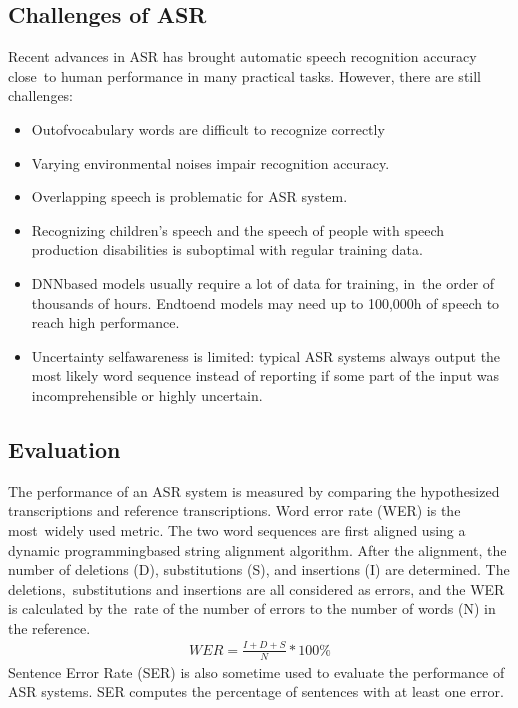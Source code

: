 \documentclass[letterpaper,10pt,english]{jupyterBook}
\begin{document}
\subsection{Challenges of ASR}
\label{\detokenize{Recognition/Speech_Recognition:challenges-of-asr}}
\sphinxAtStartPar
Recent advances in ASR has brought automatic speech recognition accuracy
close to human performance in many practical tasks. However, there are
still challenges:
\begin{itemize}
\item {} 
\sphinxAtStartPar
Out\sphinxhyphen{}of\sphinxhyphen{}vocabulary words are difficult to recognize correctly

\item {} 
\sphinxAtStartPar
Varying environmental noises impair recognition accuracy.

\item {} 
\sphinxAtStartPar
Overlapping speech is problematic for ASR system.

\item {} 
\sphinxAtStartPar
Recognizing children’s speech and the speech of people with speech
production disabilities is suboptimal with regular training data.

\item {} 
\sphinxAtStartPar
DNN\sphinxhyphen{}based models usually require a lot of data for training, in the
order of thousands of hours. End\sphinxhyphen{}to\sphinxhyphen{}end models may need up to
100,000h of speech to reach high performance.

\item {} 
\sphinxAtStartPar
Uncertainty self\sphinxhyphen{}awareness is limited: typical ASR systems always
output the most likely word sequence instead of reporting if some
part of the input was incomprehensible or highly uncertain.

\end{itemize}


\subsection{Evaluation}
\label{\detokenize{Recognition/Speech_Recognition:evaluation}}
\sphinxAtStartPar
The performance of an ASR system is measured by comparing the
hypothesized transcriptions and reference transcriptions. Word error
rate (WER) is the most widely used metric. The two word sequences are
first aligned using a dynamic programming\sphinxhyphen{}based string alignment
algorithm. After the alignment, the number of deletions (D),
substitutions (S), and insertions (I) are determined. The
deletions, substitutions and insertions are all considered as errors,
and the WER is calculated by the rate of the number of errors to the
number of words (N) in the reference.
\begin{equation*}
\begin{split} WER = \frac{I + D + S}{N} * 100\% \end{split}
\end{equation*}
\sphinxAtStartPar
Sentence Error Rate (SER) is also sometime used to evaluate the
performance of ASR systems. SER computes the percentage of sentences
with at least one error.
\end{document}
